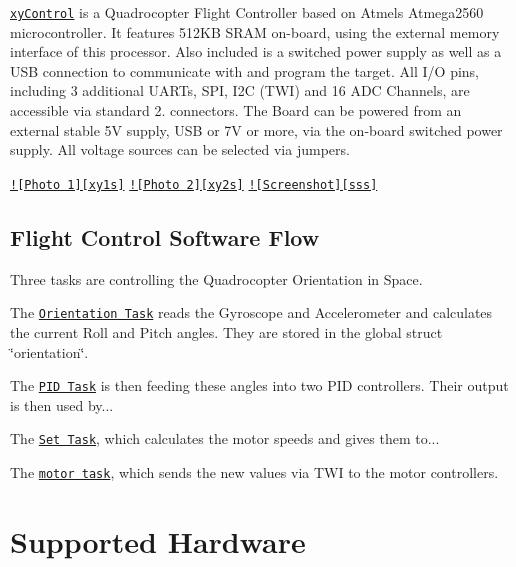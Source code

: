 

\href{https://www.github.com/xythobuz/xyControl/}{\tt xy\-Control} is a Quadrocopter Flight Controller based on Atmels Atmega2560 microcontroller. It features 512\-K\-B S\-R\-A\-M on-\/board, using the external memory interface of this processor. Also included is a switched power supply as well as a U\-S\-B connection to communicate with and program the target. All I/\-O pins, including 3 additional U\-A\-R\-Ts, S\-P\-I, I2\-C (T\-W\-I) and 16 A\-D\-C Channels, are accessible via standard 2.\-54mm connectors. The Board can be powered from an external stable 5\-V supply, U\-S\-B or 7\-V or more, via the on-\/board switched power supply. All voltage sources can be selected via jumpers.

\href{http://www.xythobuz.de/img/xycontrol1.jpg}{\tt !\mbox{[}Photo 1\mbox{]}\mbox{[}xy1s\mbox{]}} \href{http://www.xythobuz.de/img/xycontrol2.jpg}{\tt !\mbox{[}Photo 2\mbox{]}\mbox{[}xy2s\mbox{]}} \href{http://www.xythobuz.de/img/xyCopterOsci.png}{\tt !\mbox{[}Screenshot\mbox{]}\mbox{[}sss\mbox{]}}

\subsection*{Flight Control Software Flow}

Three tasks are controlling the Quadrocopter Orientation in Space.


\begin{DoxyItemize}
\item The \href{https://github.com/xythobuz/xyControl/blob/master/include/orientation.h}{\tt Orientation Task} reads the Gyroscope and Accelerometer and calculates the current Roll and Pitch angles. They are stored in the global struct \char`\"{}orientation\char`\"{}.
\item The \href{https://github.com/xythobuz/xyControl/blob/master/include/pid.h}{\tt P\-I\-D Task} is then feeding these angles into two P\-I\-D controllers. Their output is then used by...
\item The \href{https://github.com/xythobuz/xyControl/blob/master/include/set.h}{\tt Set Task}, which calculates the motor speeds and gives them to...
\item The \href{https://github.com/xythobuz/xyControl/blob/master/include/motor.h}{\tt motor task}, which sends the new values via T\-W\-I to the motor controllers.
\end{DoxyItemize}

\section*{Supported Hardware}


